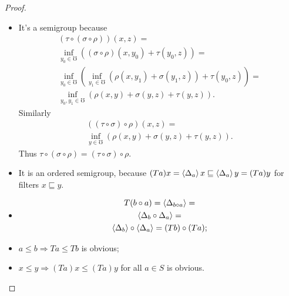 \begin{proof}
~
\begin{itemize}
\item It's a semigroup because
\begin{multline*}
(\tau\circ(\sigma\circ\rho))(x,z) = \\
\inf_{y_0\in\mho}((\sigma\circ\rho)(x,y_0)+\tau(y_0,z)) = \\
\inf_{y_0\in\mho}(\inf_{y_1\in\mho}(\rho(x,y_1)+\sigma(y_1,z))+\tau(y_0,z)) = \\
\inf_{y_0,y_1\in\mho}(\rho(x,y)+\sigma(y,z)+\tau(y,z)).
\end{multline*}
Similarly 
\begin{multline*}
((\tau\circ\sigma)\circ\rho)(x,z) = \\
\inf_{y\in\mho}(\rho(x,y)+\sigma(y,z)+\tau(y,z)).
\end{multline*}
Thus $\tau\circ(\sigma\circ\rho)=(\tau\circ\sigma)\circ\rho$.

\item It is an ordered semigroup, because
$(Ta)x = \left\langle \Delta_a\right\rangle x \sqsubseteq \left\langle \Delta_a\right\rangle y = (Ta)y$ 
for filters $x\sqsubseteq y$.

\item
\begin{multline*}
T(b\circ a) = \left\langle \Delta_{b\circ a}\right\rangle = \\ \left\langle \Delta_b\circ\Delta_a\right\rangle = \\ \left\langle \Delta_b\right\rangle\circ\left\langle \Delta_a\right\rangle = (Tb)\circ(Ta);
\end{multline*}
\item $a\leq b\Rightarrow Ta\leq Tb$ is obvious;
\item $x\leq y\Rightarrow(Ta)x\leq (Ta)y$ for all $a\in S$ is obvious.
\end{itemize}
\end{proof}


